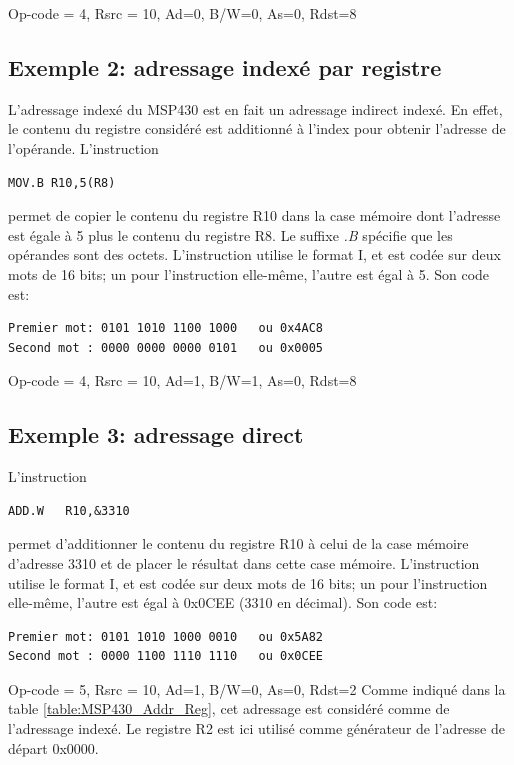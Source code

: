 Op-code = 4, Rsrc = 10, Ad=0, B/W=0, As=0, Rdst=8

\subsection{Exemple 2: adressage indexé par registre}
L'adressage indexé du MSP430 est en fait un adressage indirect indexé. En effet, le contenu du registre considéré est additionné à l'index pour obtenir l'adresse de l'opérande. L'instruction
\lstset{style=customc}
\begin{lstlisting}
MOV.B R10,5(R8)
\end{lstlisting}
permet de copier le contenu du registre R10 dans la case mémoire dont l'adresse est égale à 5 plus le contenu du registre R8. Le suffixe \textit{.B} spécifie que les opérandes sont des octets.
L'instruction utilise le format I, et est codée sur deux mots de 16 bits; un pour l'instruction elle-même, l'autre est égal à 5.
Son code est:
\lstset{style=customc}
\begin{lstlisting}
Premier mot: 0101 1010 1100 1000   ou 0x4AC8
Second mot : 0000 0000 0000 0101   ou 0x0005
\end{lstlisting}

Op-code = 4, Rsrc = 10, Ad=1, B/W=1, As=0, Rdst=8

\subsection{Exemple 3: adressage direct}
L'instruction
\lstset{style=customc}
\begin{lstlisting}
ADD.W   R10,&3310
\end{lstlisting}
permet d'additionner le contenu du registre R10 à celui de la case mémoire d'adresse 3310 et de placer le résultat dans cette case mémoire.
L'instruction utilise le format I, et est codée sur deux mots de 16 bits; un pour l'instruction elle-même, l'autre est égal à 0x0CEE (3310 en décimal).
Son code est:
\lstset{style=customc}
\begin{lstlisting}
Premier mot: 0101 1010 1000 0010   ou 0x5A82
Second mot : 0000 1100 1110 1110   ou 0x0CEE
\end{lstlisting}

Op-code = 5, Rsrc = 10, Ad=1, B/W=0, As=0, Rdst=2
Comme indiqué dans la table \ref{table:MSP430_Addr_Reg}, cet adressage est considéré comme de l'adressage indexé. Le registre R2 est ici utilisé comme générateur de l'adresse de départ 0x0000.

